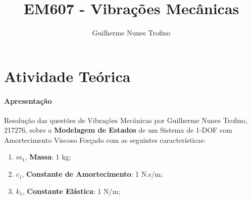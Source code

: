 \documentclass{article}
\title{EM607 - Vibrações Mecânicas}
\author{Guilherme Nunes Trofino}
\begin{document}
    \maketitle
\newpage

\section{Atividade Teórica}
\paragraph{Apresentação}Resolução das questões de Vibrações Mecânicas por Guilherme Nunes Trofino, 217276, sobre a \textbf{Modelagem de Estados} de um Sistema de 1-DOF com Amortecimento Viscoso Forçado com as seguintes características:
\begin{enumerate}
    \item $m_1$, \textbf{Massa}: 1 kg;
    \item $c_1$, \textbf{Constante de Amortecimento}: 1 N.s/m;
    \item $k_1$, \textbf{Constante Elástica}: 1 N/m;
\end{enumerate}

\begin{exercise}\label{ex1}

\end{exercise}
\begin{resolution}

\end{resolution}
\end{document}
